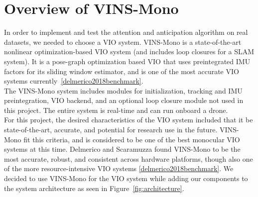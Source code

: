 
\section{Overview of VINS-Mono}\label{sec:vinsmono}

In order to implement and test the attention and anticipation algorithm on real datasets, we needed to choose a VIO system. VINS-Mono is a state-of-the-art nonlinear optimization-based VIO system (and includes loop closures for a SLAM system). It is a pose-graph optimization based VIO that uses preintegrated IMU factors for its sliding window estimator, and is one of the most accurate VIO systems currently~\ref{delmerico2018benchmark}. \\
The VINS-Mono system includes modules for initialization, tracking and IMU preintegration, VIO backend, and an optional loop closure module not used in this project. The entire system is real-time and can run onboard a drone. 
\\
For this project, the desired characteristics of the VIO system included that it be state-of-the-art, accurate, and potential for research use in the future. VINS-Mono fit this criteria, and is considered to be one of the best monocular VIO systems at this time. Delmerico and Scaramuzza found VINS-Mono to be the most accurate, robust, and consistent across hardware platforms, though also one of the more resource-intensive VIO systems \ref{delmerico2018benchmark}. We decided to use VINS-Mono for the VIO system while adding our components to the system architecture as seen in Figure~\ref{fig:architecture}. 